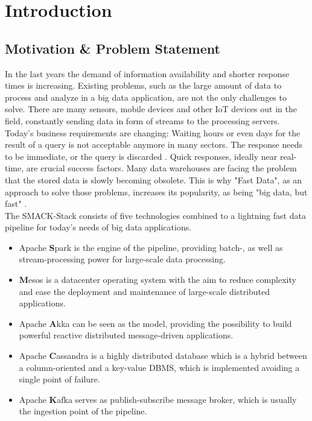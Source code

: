 \chapter{Introduction}
\label{ch:introduction}

\section{Motivation \& Problem Statement}
\label{sec:motivation}
In the last years the demand of information availability and shorter response times is increasing.
Existing problems, such as the large amount of data to process and analyze in a big data application, are not the only challenges to solve.
There are many sensors, mobile devices and other IoT devices out in the field, constantly sending data in form of streams to the processing servers.\\
Today's business requirements are changing: Waiting hours or even days for the result of a query is not acceptable anymore in many sectors.
The response needs to be immediate, or the query is discarded \cite{estrada2016big}.
Quick responses, ideally near real-time, are crucial success factors.
Many data warehouses are facing the problem that the stored data is slowly becoming obsolete.
This is why "Fast Data", as an approach to solve those problems, increases its popularity, as being "big data, but fast" \cite{mishne2013fast}. \\


The SMACK-Stack consists of five technologies combined to a lightning fast data pipeline for today's needs of big data applications.\\
\begin{itemize}
    \item Apache \textbf{S}park is the engine of the pipeline, providing batch-, as well as stream-processing power for large-scale data processing.
    \item \textbf{M}esos is a datacenter operating system with the aim to reduce complexity and ease the deployment and maintenance of large-scale distributed applications.\\
    \item Apache \textbf{A}kka can be seen as the model, providing the possibility to build powerful reactive distributed message-driven applications.\\
    \item Apache \textbf{C}assandra is a highly distributed database which is a hybrid between a column-oriented and a key-value DBMS, which is implemented avoiding a single point of failure.\\
    \item Apache \textbf{K}afka serves as publish-subscribe message broker, which is usually the ingestion point of the pipeline.\\
\end{itemize}


